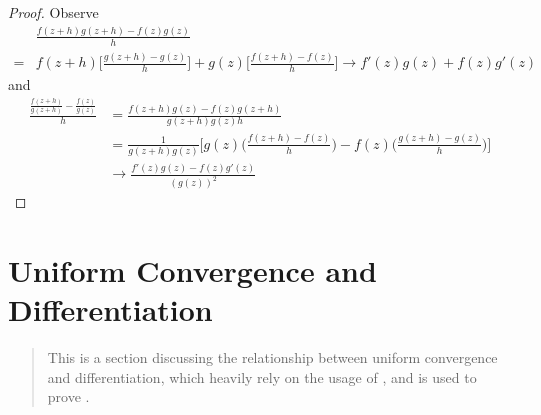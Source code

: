 \documentclass{report}
\begin{document}
\begin{proof}
Observe
\begin{align*}
  &\frac{f(z+h)g(z+h)-f(z)g(z)}{h}\\
  =&f(z+h)\Big[\frac{g(z+h)-g(z)}{h} \Big] +g(z) \Big[\frac{f(z+h)-f(z)}{h} \Big]\to f'(z)g(z)+f(z)g'(z)
\end{align*}
and 
\begin{align*}
\frac{\frac{f(z+h)}{g(z+h)}-\frac{f(z)}{g(z)}}{h}&= \frac{f(z+h)g(z)-f(z)g(z+h)}{g(z+h)g(z)h}\\
&=\frac{1}{g(z+h)g(z)}\Big[ g(z)\Big(\frac{f(z+h)-f(z)}{h}\Big)-f(z)\Big(\frac{g(z+h)-g(z)}{h} \Big) \Big]\\
&\to \frac{f'(z)g(z)-f(z)g'(z)}{(g(z))^2}
\end{align*}
\end{proof}
\section{Uniform Convergence and Differentiation}
\begin{abstract}
This is a section discussing the relationship between uniform convergence and differentiation, which heavily rely on the usage of , and is used to prove . 
\end{abstract}
\end{document}
